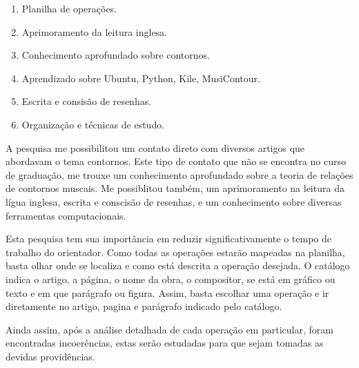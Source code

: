 \documentclass[11pt]{article}
\begin{document}
\begin{enumerate} 
\item Planilha de operações.
\item Aprimoramento da leitura inglesa.
\item Conhecimento aprofundado sobre contornos.
\item Aprendizado sobre Ubuntu, Python, Kile, MusiContour.
\item Escrita e consisão de resenhas.
\item Organização e técnicas de estudo.
\end{enumerate}


\label{sec:discussao}

A pesquisa me possibilitou um contato direto com diversos artigos que abordavam
o tema contornos. Este tipo de contato que não se encontra no curso de graduação, 
me trouxe um conhecimento aprofundado sobre a teoria de relações de contornos muscais. 
Me possiblitou também, um aprimoramento na leitura da lígua inglesa, escrita e conscisão 
de resenhas, e um conhecimento sobre diversas ferramentas computacionais.

Esta pesquisa tem sua importância em reduzir significativamente o
tempo de trabalho do orientador. Como todas as operações estarão mapeadas
na planilha, basta olhar onde se localiza e como está descrita a operação
desejada. O catálogo indica o artigo, a página, o nome da obra, o compositor,
se está em gráfico ou texto e em que parágrafo ou figura. Assim, basta escolhar 
uma operação e ir diretamente no artigo, pagina e parágrafo indicado pelo
catálogo.

Ainda assim, após a análise detalhada de cada operação em particular,
foram encontradas incoerências, estas serão estudadas para que sejam
tomadas as devidas providências.

\end{document}

